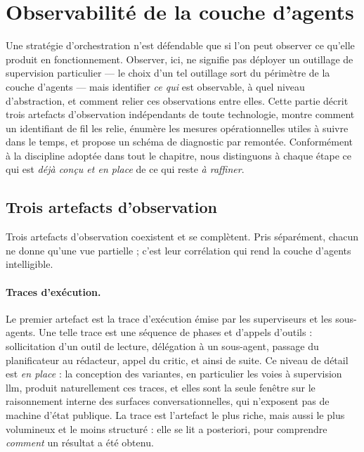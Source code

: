 \section{Observabilité de la couche d'agents}
\label{sec:observabilite}

Une stratégie d'orchestration n'est défendable que si l'on peut
observer ce qu'elle produit en fonctionnement. Observer, ici, ne
signifie pas déployer un outillage de supervision particulier — le
choix d'un tel outillage sort du périmètre de la couche d'agents — mais
identifier \emph{ce qui} est observable, à quel niveau d'abstraction,
et comment relier ces observations entre elles. Cette partie décrit
trois artefacts d'observation indépendants de toute technologie,
montre comment un identifiant de fil les relie, énumère les mesures
opérationnelles utiles à suivre dans le temps, et propose un schéma de
diagnostic par remontée. Conformément à la discipline adoptée dans
tout le chapitre, nous distinguons à chaque étape ce qui est
\emph{déjà conçu et en place} de ce qui reste \emph{à raffiner}.

\subsection{Trois artefacts d'observation}
\label{sec:artefacts}

Trois artefacts d'observation coexistent et se complètent. Pris
séparément, chacun ne donne qu'une vue partielle ; c'est leur
corrélation qui rend la couche d'agents intelligible.

\paragraph{Traces d'exécution.}
Le premier artefact est la trace d'exécution émise par les
superviseurs et les sous-agents. Une telle trace est une séquence de
phases et d'appels d'outils : sollicitation d'un outil de lecture,
délégation à un sous-agent, passage du planificateur au rédacteur,
appel du critic, et ainsi de suite. Ce niveau de détail est
\emph{en place} : la conception des variantes, en particulier les
voies à supervision \gls{llm}, produit naturellement ces traces, et
elles sont la seule fenêtre sur le raisonnement interne des surfaces
conversationnelles, qui n'exposent pas de machine d'état publique. La
trace est l'artefact le plus riche, mais aussi le plus volumineux et
le moins structuré : elle se lit a posteriori, pour comprendre
\emph{comment} un résultat a été obtenu.


